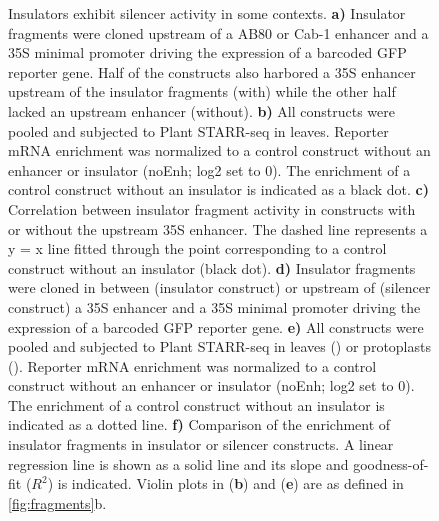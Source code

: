 \documentclass[10pt]{article}
\newcommand{\fignormal}{\scriptsize} %
\newcommand{\usename}[1]{\csname#1\endcsname}
\newif\ifnpc
\newcounter{fig}
\newenvironment{fig}{%
	\begin{figure}[p]%
		\stepcounter{fig}%
		\pdfbookmark{\figurename\ \thefig}{figure\thefig}
		\tikzsetnextfilename{figure\thefig}%
		\fignormal%
		\centering%
}{%
	\end{figure}%
	\clearpage%
	\ifnpc%
		\makenextpagecaption%
		\global\npcfalse%
	\fi%
}
\newcommand{\titleend}{ }
\newcommand{\nextentry}{ }
\newcommand{\captiontitle}[2][]{#2.\titleend}
\newif\ifsubfigupper
\newcounter{subfig}[figure]
\newcommand{\subfigrefsep}{ }
\newcommand{\subfigunformatted}[1]{\ifsubfigupper\uppercase{#1}\else\lowercase{#1}\fi}
\newcommand{\plainsubfigref}[1]{\textbf{\subfigunformatted{#1}}}
\newcommand{\subfig}[1]{\textbf{\plainsubfigref{#1})}\subfigrefsep}
\newcommand{\parensubfig}[2][]{(#1\plainsubfigref{#2})}
\begin{document}
		\begin{fig}
			\caption{%
				\captiontitle{Insulators exhibit silencer activity in some contexts}%
				\subfig{A} Insulator fragments were cloned upstream of a \usename{AB80} or \usename{Cab-1} enhancer and a 35S minimal promoter driving the expression of a barcoded GFP reporter gene. Half of the constructs also harbored a \usename{35S} enhancer upstream of the insulator fragments (\usename{with}) while the other half lacked an upstream enhancer (\usename{without}).\nextentry
				\subfig{B} All constructs were pooled and subjected to Plant STARR-seq in \tobacco leaves. Reporter mRNA enrichment was normalized to a control construct without an enhancer or insulator (noEnh; log2 set to 0). The enrichment of a control construct without an insulator is indicated as a black dot.\nextentry
				\subfig{C}  Correlation between insulator fragment activity in constructs with or without the upstream \usename{35S} enhancer. The dashed line represents a y = x line fitted through the point corresponding to a control construct without an insulator (black dot).\nextentry
				\subfig{D} Insulator fragments were cloned in between (insulator construct) or upstream of (silencer construct) a \usename{35S} enhancer and a 35S minimal promoter driving the expression of a barcoded GFP reporter gene.\nextentry
				\subfig{E} All constructs were pooled and subjected to Plant STARR-seq in \tobacco leaves (\tobacco) or \maize protoplasts (\maize). Reporter mRNA enrichment was normalized to a control construct without an enhancer or insulator (noEnh; log2 set to 0). The enrichment of a control construct without an insulator is indicated as a dotted line.\nextentry
				\subfig{F} Comparison of the enrichment of insulator fragments in insulator or silencer constructs. A linear regression line is shown as a solid line and its slope and goodness-of-fit ($R^2$) is indicated.\nextentry
				Violin plots in \parensubfig{B} and \parensubfig{E} are as defined in \cref{fig:fragments}\subfigunformatted{B}.
			}%
			\label{fig:silencer}%
		\end{fig}
		
\end{document}

